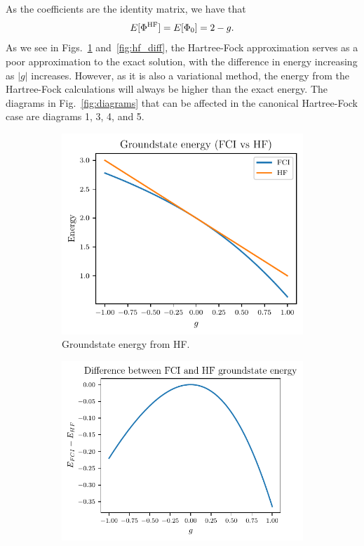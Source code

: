 As the coefficients are the identity matrix, we have that
\begin{equation*}
    E[\Phi^{\mathrm{HF}}] = E[\Phi_0] = 2 - g.
\end{equation*}
As we see in Figs.~\ref{fig:hf_energy} and~\ref{fig:hf_diff}, the Hartree-Fock approximation serves as a poor approximation to the exact solution, with the difference in energy increasing as $|g|$ increases.
However, as it is also a variational method, the energy from the Hartree-Fock calculations will always be higher than the exact energy.
The diagrams in Fig.~\ref{fig:diagrams} that can be affected in the canonical Hartree-Fock case are diagrams 1, 3, 4, and 5.

\begin{figure}
    \centering
    \begin{subfigure}[b]{0.45\textwidth}
        \centering
        \includegraphics[width=\textwidth]{figures/e_groundstate_energy.pdf}
        \caption{
            Groundstate energy from HF.\label{fig:hf_energy}
        }
    \end{subfigure}
    \hfill
    \begin{subfigure}[b]{0.5\textwidth}
        \centering
        \includegraphics[width=\textwidth]{figures/e_groundstate_energy_diff.pdf}

\end{subfigure}
\end{figure}
